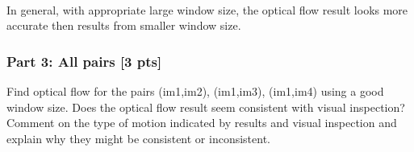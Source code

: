 \documentclass[11pt]{article}
\begin{document}
    \begin{center}
    \end{center}
    { \hspace*{\fill} \\}
    
    \begin{center}
    \end{center}
    { \hspace*{\fill} \\}
    
    \begin{center}
    \end{center}
    { \hspace*{\fill} \\}
    
    In general, with appropriate large window size, the optical flow result
looks more accurate then results from smaller window size.

    \hypertarget{part-3-all-pairs-3-pts}{%
\subsubsection{Part 3: All pairs {[}3
pts{]}}\label{part-3-all-pairs-3-pts}}

Find optical flow for the pairs (im1,im2), (im1,im3), (im1,im4) using a
good window size. Does the optical flow result seem consistent with
visual inspection? Comment on the type of motion indicated by results
and visual inspection and explain why they might be consistent or
inconsistent.
\end{document}
